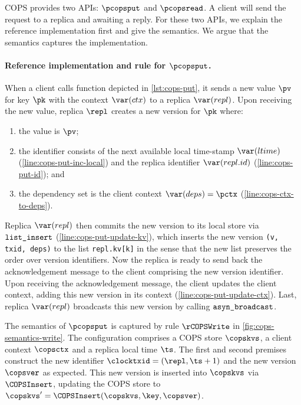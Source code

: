 COPS provides two APIs: \( \pcopsput\) and \( \pcopsread\).
A client will send the request to a replica and awaiting a reply.
For these two APIs, we explain the reference implementation first and give the semantics.
We argue that the semantics captures the implementation.

\paragraph{Reference implementation and rule for \(\pcopsput\).} 
When a client calls \pcopsput function depicted in \cref{lst:cops-put},
it sends a new value \( \pv \) for key \( \pk \) 
with the context \( \var(ctx) \) to a replica  \( \var(repl) \).
Upon receiving the new value,  
replica \( \repl \) creates a new version for \( \pk \) where:
\begin{enumerate}
\item the value is \( \pv \);
\item the identifier consists of the next available local time-stamp \( \var(ltime) \) (\cref{line:cops-put-inc-local}) 
and the replica identifier \( \var(repl.id)\) (\cref{line:cops-put-id}); and
\item the dependency set is the client context \( \var(deps) = \pctx \) (\cref{line:cops-ctx-to-deps}).
\end{enumerate}
Replica \( \var(repl) \) then commits the new version to its local store via \( \verb|list_insert| \) (\cref{line:cops-put-update-kv}),
which inserts the new version \verb|(v, txid, deps)| to the list \verb|repl.kv[k]| 
in the sense that the new list preserves the order over version identifiers.
Now the replica is ready to send back the acknowledgement message to the client comprising the new version identifier.
Upon receiving the acknowledgement message, the client updates the client context,
adding this new version in its context (\cref{line:cops-put-update-ctx}).
Last, replica \( \var(repl) \) broadcasts this new version by calling \( \verb|asyn_broadcast| \).



The semantics of \(\pcopsput\) is captured by rule \(\rCOPSWrite\) in \cref{fig:cops-semantics-write}.
The configuration comprises a COPS store \( \copskvs \), a client context \( \copsctx \) and a replica local time  \( \ts \).
The first and second premises construct the new identifier \( \clocktxid = (\repl,\ts+1) \)
and the new version \( \copsver \) as expected.
This new version is inserted into \( \copskvs \) via \( \COPSInsert \),
updating the COPS store to \( \copskvs' = \COPSInsert(\copskvs, \key, \copsver)\).

